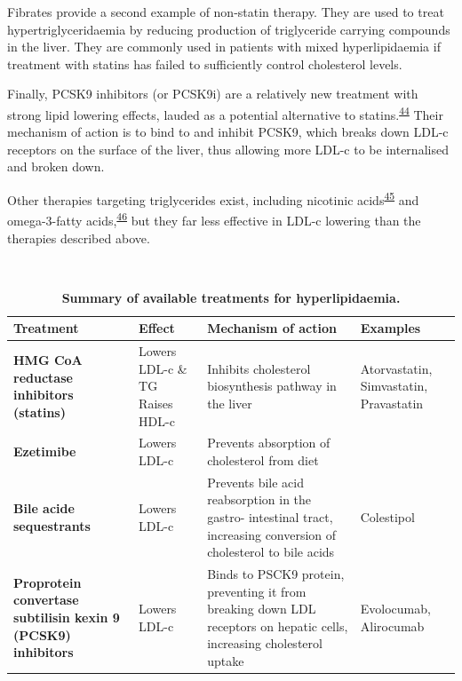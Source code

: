 \documentclass[a4paper, twoside]{templates/ociamthesis}
\begin{document}
Fibrates provide a second example of non-statin therapy. They are used to treat hypertriglyceridaemia by reducing production of triglyceride carrying compounds in the liver. They are commonly used in patients with mixed hyperlipidaemia if treatment with statins has failed to sufficiently control cholesterol levels.

Finally, PCSK9 inhibitors (or PCSK9i) are a relatively new treatment with strong lipid lowering effects, lauded as a potential alternative to statins.\textsuperscript{\protect\hyperlink{ref-chaudhary2017}{44}} Their mechanism of action is to bind to and inhibit PCSK9, which breaks down LDL-c receptors on the surface of the liver, thus allowing more LDL-c to be internalised and broken down.

Other therapies targeting triglycerides exist, including nicotinic acids\textsuperscript{\protect\hyperlink{ref-mckenney2004}{45}} and omega-3-fatty acids,\textsuperscript{\protect\hyperlink{ref-skulas2019}{46}} but they far less effective in LDL-c lowering than the therapies described above.

~



\begin{table}[H]

\caption{\label{tab:lipidTreatments-table}\textbf{Summary of available treatments for hyperlipidaemia.}}
\centering
\begin{tabular}[t]{>{\raggedright\arraybackslash}p{8em}>{\raggedright\arraybackslash}p{8em}>{\raggedright\arraybackslash}p{8em}>{\raggedright\arraybackslash}p{8em}}
\toprule
\textbf{Treatment} & \textbf{Effect} & \textbf{Mechanism of action} & \textbf{Examples}\\
\midrule
\textbf{HMG CoA reductase inhibitors (statins)} & Lowers LDL-c \& TG \newline Raises HDL-c & Inhibits cholesterol biosynthesis pathway in the liver & Atorvastatin, \newline Simvastatin, \newline Pravastatin\\
\midrule
\textbf{Ezetimibe} & Lowers LDL-c & Prevents absorption of cholesterol from diet & \\
\midrule
\textbf{Bile acide sequestrants} & Lowers LDL-c & Prevents bile acid reabsorption in the gastro- intestinal tract, increasing conversion of cholesterol to bile acids & Colestipol\\
\midrule
\textbf{Proprotein convertase subtilisin kexin 9 (PCSK9) inhibitors} & Lowers LDL-c & Binds to PSCK9 protein, preventing it from breaking down LDL receptors on hepatic cells, increasing cholesterol uptake & Evolocumab, \newline Alirocumab\\
\bottomrule
\end{tabular}
\end{table}
\end{document}
